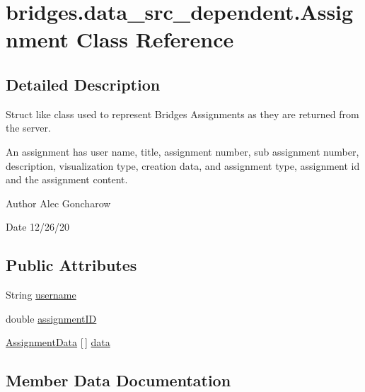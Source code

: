 \hypertarget{classbridges_1_1data__src__dependent_1_1_assignment}{}\section{bridges.\+data\+\_\+src\+\_\+dependent.\+Assignment Class Reference}
\label{classbridges_1_1data__src__dependent_1_1_assignment}


\subsection{Detailed Description}
Struct like class used to represent Bridges Assignments as they are returned from the server. 

An assignment has user name, title, assignment number, sub assignment number, description, visualization type, creation data, and assignment type, assignment id and the assignment content.

\begin{DoxyAuthor}{Author}
Alec Goncharow 
\end{DoxyAuthor}
\begin{DoxyDate}{Date}
12/26/20 
\end{DoxyDate}
\subsection*{Public Attributes}
\begin{DoxyCompactItemize}
\item 
String \hyperlink{classbridges_1_1data__src__dependent_1_1_assignment_aa7326ba8e0eb02fff4e5b22e4b89e61d}{username}
\item 
double \hyperlink{classbridges_1_1data__src__dependent_1_1_assignment_a88c98da9e5ba6f8d83326d6fbae659d8}{assignment\+ID}
\item 
\hyperlink{classbridges_1_1data__src__dependent_1_1_assignment_data}{Assignment\+Data} \mbox{[}$\,$\mbox{]} \hyperlink{classbridges_1_1data__src__dependent_1_1_assignment_a23d503c5e6eae939bb8262dc8e18c259}{data}
\end{DoxyCompactItemize}


\subsection{Member Data Documentation}
\mbox{\label{classbridges_1_1data__src__dependent_1_1_assignment_a88c98da9e5ba6f8d83326d6fbae659d8}} 
